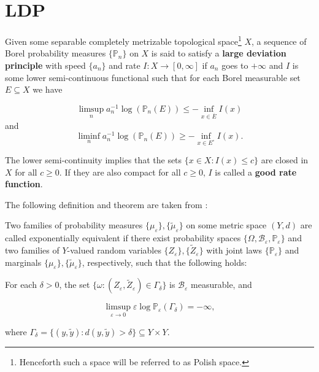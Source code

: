 \section{LDP}
\begin{definition}\label{def:LDP}
	Given some separable completely metrizable topological space\footnote{Henceforth such a space will be referred to as Polish space.} $X$, a sequence of Borel probability measures $\{\mathbb P_n\}$ on $X$ is said to satisfy a \textbf{large deviation principle} with speed $\{a_n\}$ and rate $I:X\rightarrow [0,\infty]$ if $a_n$ goes to $+\infty$ and $I$ is some lower semi-continuous functional such that for each Borel measurable set $E\subseteq X$ we have
	
	$$\limsup_n a_n^{-1}\log(\mathbb P_n(E))\leq -\inf_{x\in \overline E}I(x)$$
	and
	$$\liminf_n a_n^{-1}\log(\mathbb P_n(E))\geq -\inf_{x\in E^\circ}I(x).$$
	
	The lower semi-continuity implies that the sets $\{x\in X: I(x)\leq c\}$ are closed in $X$ for all $c\geq 0$. If they are also compact for all $c\geq 0$, $I$ is called a \textbf{good rate function}.
\end{definition}

The following definition and theorem are taken from \cite{Dembo2009LargeDeviations}:

\begin{definition}\label{def:exponentialequivalence}
	Two families of probability measures $\{\mu_\varepsilon\}, \{\tilde \mu_\varepsilon\}$ on some metric space $(Y,d)$ are called exponentially equivalent if there exist probability spaces $\{\Omega, \mathcal B_\varepsilon,\mathbb P_\varepsilon\}$ and two families of $Y$-valued random variables $\{Z_\varepsilon\}, \{\tilde Z_\varepsilon\}$ with joint laws $\{\mathbb P_\varepsilon\}$ and marginals $\{\mu_\varepsilon\}, \{\tilde \mu_\varepsilon\}$, respectively, such that the following holds:
	
	For each $\delta>0$, the set $\{\omega : (Z_\varepsilon, \tilde Z_\varepsilon)\in\Gamma_\delta\}$ is $\mathcal B_\varepsilon$ measurable, and 
	
	$$\limsup_{\varepsilon\rightarrow 0}\varepsilon\log\mathbb P_\varepsilon(\Gamma_\delta)=-\infty,$$
	
	where $\Gamma_\delta = \{(y,\tilde y):d(y,\tilde y)>\delta\}\subseteq Y\times Y$.
\end{definition}

